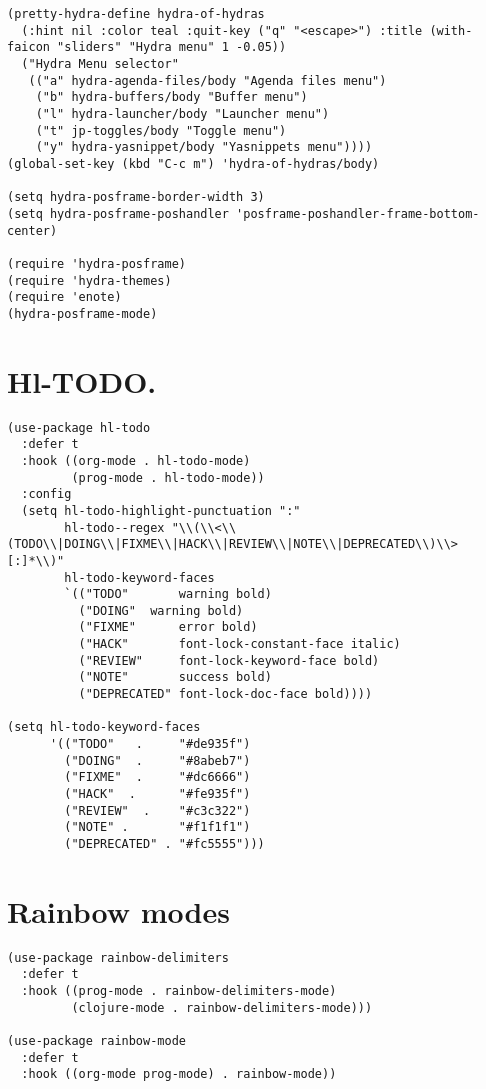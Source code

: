 \documentclass[11pt]{article}
\begin{document}
\begin{verbatim}
(pretty-hydra-define hydra-of-hydras 
  (:hint nil :color teal :quit-key ("q" "<escape>") :title (with-faicon "sliders" "Hydra menu" 1 -0.05))
  ("Hydra Menu selector"
   (("a" hydra-agenda-files/body "Agenda files menu")
    ("b" hydra-buffers/body "Buffer menu")
    ("l" hydra-launcher/body "Launcher menu")
    ("t" jp-toggles/body "Toggle menu")
    ("y" hydra-yasnippet/body "Yasnippets menu"))))
(global-set-key (kbd "C-c m") 'hydra-of-hydras/body)

(setq hydra-posframe-border-width 3)
(setq hydra-posframe-poshandler 'posframe-poshandler-frame-bottom-center)

(require 'hydra-posframe)
(require 'hydra-themes)
(require 'enote)
(hydra-posframe-mode)
\end{verbatim}
\section{Hl-TODO.}
\label{sec:org3788adc}
\begin{verbatim}
(use-package hl-todo
  :defer t
  :hook ((org-mode . hl-todo-mode)
         (prog-mode . hl-todo-mode))
  :config
  (setq hl-todo-highlight-punctuation ":"
        hl-todo--regex "\\(\\<\\(TODO\\|DOING\\|FIXME\\|HACK\\|REVIEW\\|NOTE\\|DEPRECATED\\)\\>[:]*\\)"
        hl-todo-keyword-faces
        `(("TODO"       warning bold)
          ("DOING"	warning bold)
          ("FIXME"      error bold)
          ("HACK"       font-lock-constant-face italic)
          ("REVIEW"     font-lock-keyword-face bold)
          ("NOTE"       success bold)
          ("DEPRECATED" font-lock-doc-face bold))))

(setq hl-todo-keyword-faces
      '(("TODO"   .		"#de935f")
        ("DOING"  .		"#8abeb7")
        ("FIXME"  . 	"#dc6666")
        ("HACK"  . 		"#fe935f")
        ("REVIEW"  . 	"#c3c322")
        ("NOTE" . 		"#f1f1f1")
        ("DEPRECATED" . "#fc5555")))

\end{verbatim}
\section{Rainbow modes}
\label{sec:orgcc52f7b}
\begin{verbatim}
(use-package rainbow-delimiters
  :defer t
  :hook ((prog-mode . rainbow-delimiters-mode)
         (clojure-mode . rainbow-delimiters-mode)))

(use-package rainbow-mode
  :defer t
  :hook ((org-mode prog-mode) . rainbow-mode))
\end{verbatim}
\end{document}
